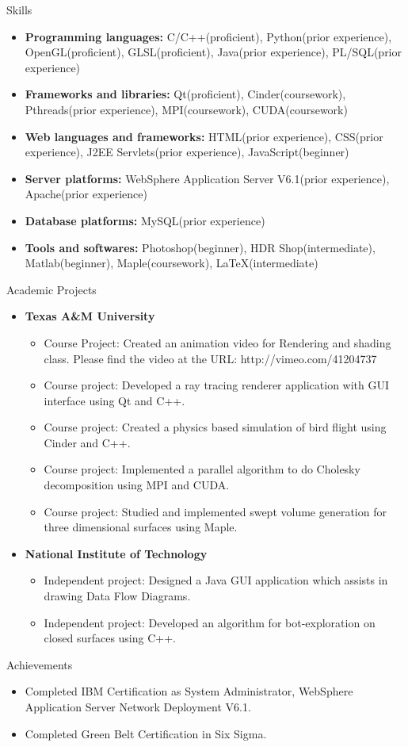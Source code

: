 \documentclass[11pt,oneside]{article}
\newenvironment{ressection}[1]{
  \vspace{4pt}
  {\fontfamily{phv}\selectfont\Large#1}
  \begin{itemize}
  \vspace{3pt}
}{
  \end{itemize}
}
\newcommand{\resitem}[1]{
  \vspace{-4pt}
  \item \begin{flushleft} #1 \end{flushleft}
}
\newcommand{\ressubitem}[1]{
  \vspace{-1pt}
  \item \begin{flushleft} #1 \end{flushleft}
}
\newenvironment{reslist}[1]{
  \resitem{\textbf{#1}}
  \vspace{-5pt}
  \begin{itemize}
}{
  \end{itemize}
}
\begin{document}
\begin{ressection}{Skills}

  \resitem{\textbf{Programming languages:} C/C++(proficient), Python(prior experience), OpenGL(proficient), GLSL(proficient), Java(prior experience), PL/SQL(prior experience)}
  \resitem{\textbf{Frameworks and libraries:} Qt(proficient), Cinder(coursework), Pthreads(prior experience), MPI(coursework), CUDA(coursework)}
  \resitem{\textbf{Web languages and frameworks:} HTML(prior experience), CSS(prior experience), J2EE Servlets(prior experience), JavaScript(beginner)}
  \resitem{\textbf{Server platforms:} WebSphere Application Server V6.1(prior experience), Apache(prior experience)}
    \resitem{\textbf{Database platforms:} MySQL(prior experience)}
  \resitem{\textbf{Tools and softwares:} Photoshop(beginner), HDR Shop(intermediate), Matlab(beginner), Maple(coursework), \LaTeX{}(intermediate)}

\end{ressection}


\begin{ressection}{Academic Projects}

  \begin{reslist}{Texas A\&M University}
      \ressubitem{Course Project: Created an animation video for Rendering and shading class. Please find the video at the URL: http://vimeo.com/41204737}
      \ressubitem{Course project: Developed a ray tracing renderer application with GUI interface using Qt and C++.}
      \ressubitem{Course project: Created a physics based simulation of bird flight using Cinder and C++.}
      \ressubitem{Course project: Implemented a parallel algorithm to do Cholesky decomposition using MPI and CUDA.}
      \ressubitem{Course project: Studied and implemented swept volume generation for three dimensional surfaces using Maple.}
  \end{reslist}

  \begin{reslist}{National Institute of Technology}
      \ressubitem{Independent project: Designed a Java GUI application which assists in drawing Data Flow Diagrams.}
      \ressubitem{Independent project: Developed an algorithm for bot-exploration on closed surfaces using C++.}
  \end{reslist}
  
\end{ressection}  





\begin{ressection}{Achievements}
  \resitem{Completed IBM Certification as System Administrator, WebSphere Application Server Network Deployment V6.1.}
  \resitem{Completed Green Belt Certification in Six Sigma.}
  
\end{ressection}
\end{document}
